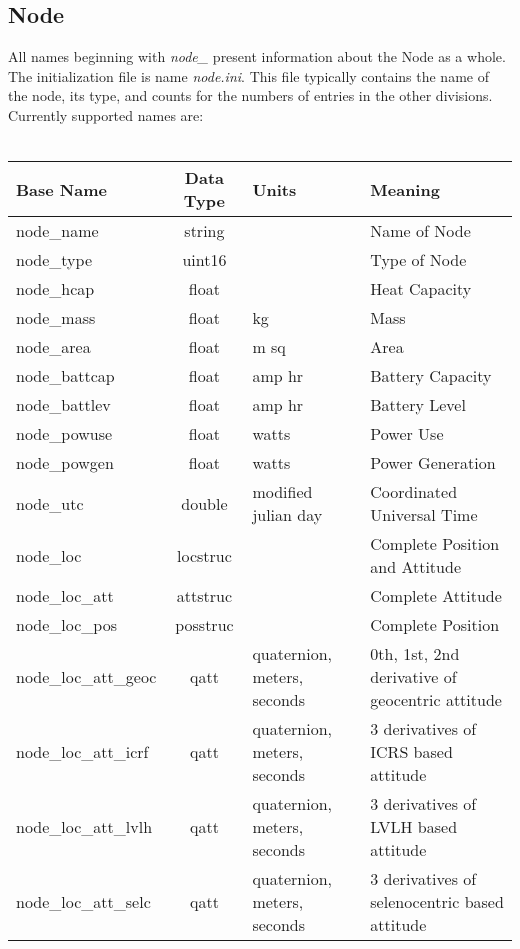 \documentclass[10pt,letterpaper]{report}
\begin{document}
\subsection{Node}
All names beginning with \emph{node\_} present information about the Node as a whole. The initialization file is name \emph{node.ini}. This file typically contains the name  of the node, its type, and counts for the numbers of entries in the other divisions. Currently supported names are:
\\
\\
\begin{tabular}{|l|c|l|l|}
\hline \textbf{Base Name} &\textbf{Data Type}  & \textbf{Units} & \textbf{Meaning}\\ 
\hline node\_name & string &  & Name of Node \\ 
\hline node\_type & uint16 &  & Type of Node \\ 
\hline node\_hcap & float &  & Heat Capacity \\ 
\hline node\_mass & float & kg & Mass \\ 
\hline node\_area & float & m sq & Area \\ 
\hline node\_battcap & float & amp hr & Battery Capacity \\ 
\hline node\_battlev & float & amp hr & Battery Level \\ 
\hline node\_powuse & float & watts & Power Use \\ 
\hline node\_powgen & float & watts & Power Generation \\ 
\hline node\_utc & double & modified julian day & Coordinated Universal Time \\ 
\hline node\_loc & locstruc & & Complete Position and Attitude \\
\hline node\_loc\_att & attstruc & & Complete Attitude \\
\hline node\_loc\_pos & posstruc & & Complete Position \\
\hline node\_loc\_att\_geoc & qatt & quaternion, meters, seconds & 0th, 1st, 2nd derivative of geocentric attitude\\ 
\hline node\_loc\_att\_icrf & qatt & quaternion, meters, seconds & 3 derivatives of ICRS based attitude \\ 
\hline node\_loc\_att\_lvlh & qatt & quaternion, meters, seconds & 3 derivatives of LVLH based attitude \\ 
\hline node\_loc\_att\_selc & qatt & quaternion, meters, seconds & 3 derivatives of selenocentric based attitude \\ 

\end{tabular}
\end{document}
